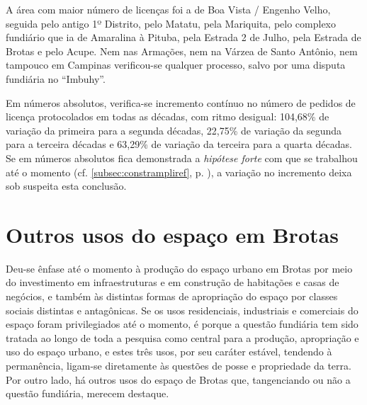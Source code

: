 

A área com maior número de licenças foi a de Boa Vista / Engenho Velho, seguida pelo antigo 1º Distrito, pelo Matatu, pela Mariquita, pelo complexo fundiário que ia de Amaralina à Pituba, pela Estrada 2 de Julho, pela Estrada de Brotas e pelo Acupe. Nem nas Armações, nem na Várzea de Santo Antônio, nem tampouco em Campinas verificou-se qualquer processo, salvo por uma disputa fundiária no ``Imbuhy''.

Em números absolutos, verifica-se incremento contínuo no número de pedidos de licença protocolados em todas as décadas, com ritmo desigual: 104,68\% de variação da primeira para a segunda décadas, 22,75\% de variação da segunda para a terceira décadas e 63,29\% de variação da terceira para a quarta décadas. Se em números absolutos fica demonstrada a \textit{hipótese forte} com que se trabalhou até o momento (cf. \autoref{subsec:constrampliref}, p. \pageref{subsec:constrampliref}), a variação no incremento deixa sob suspeita esta conclusão.

\section{Outros usos do espaço em Brotas}

Deu-se ênfase até o momento à produção do espaço urbano em Brotas por meio do investimento em infraestruturas e em construção de habitações e casas de negócios, e também às distintas formas de apropriação do espaço por classes sociais distintas e antagônicas. Se os usos residenciais, industriais e comerciais do espaço foram privilegiados até o momento, é porque a questão fundiária tem sido tratada ao longo de toda a pesquisa como central para a produção, apropriação e uso do espaço urbano, e estes três usos, por seu caráter estável, tendendo à permanência, ligam-se diretamente às questões de posse e propriedade da terra. Por outro lado, há outros usos do espaço de Brotas que, tangenciando ou não a questão fundiária, merecem destaque.

